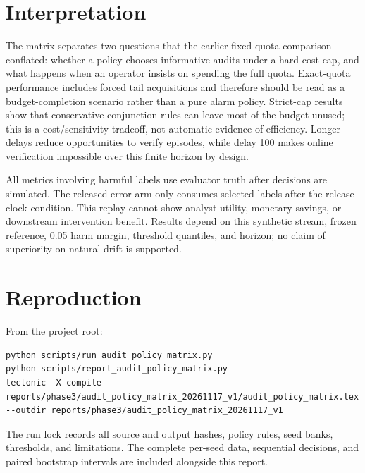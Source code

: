 \documentclass[10pt]{article}
\begin{document}
\section{Interpretation}
The matrix separates two questions that the earlier fixed-quota comparison conflated: whether a policy chooses informative audits under a hard cost cap, and what happens when an operator insists on spending the full quota. Exact-quota performance includes forced tail acquisitions and therefore should be read as a budget-completion scenario rather than a pure alarm policy. Strict-cap results show that conservative conjunction rules can leave most of the budget unused; this is a cost/sensitivity tradeoff, not automatic evidence of efficiency. Longer delays reduce opportunities to verify episodes, while delay 100 makes online verification impossible over this finite horizon by design.

All metrics involving harmful labels use evaluator truth after decisions are simulated. The released-error arm only consumes selected labels after the release clock condition. This replay cannot show analyst utility, monetary savings, or downstream intervention benefit. Results depend on this synthetic stream, frozen reference, 0.05 harm margin, threshold quantiles, and horizon; no claim of superiority on natural drift is supported.
\section{Reproduction}
From the project root:
\begin{verbatim}
python scripts/run_audit_policy_matrix.py
python scripts/report_audit_policy_matrix.py
tectonic -X compile reports/phase3/audit_policy_matrix_20261117_v1/audit_policy_matrix.tex --outdir reports/phase3/audit_policy_matrix_20261117_v1
\end{verbatim}
The run lock records all source and output hashes, policy rules, seed banks, thresholds, and limitations. The complete per-seed data, sequential decisions, and paired bootstrap intervals are included alongside this report.
\end{document}
